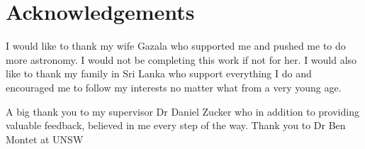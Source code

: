 \chapter{Acknowledgements}

I would like to thank my wife Gazala who supported me and pushed me to do more astronomy. I would not be completing this work if not for her. I would also like to thank my family in Sri Lanka who support everything I do and encouraged me to follow my interests no matter what from a very young age. 

A big thank you to my supervisor Dr Daniel Zucker who in addition to providing valuable feedback, believed in me every step of the way. Thank you to Dr Ben Montet at UNSW 